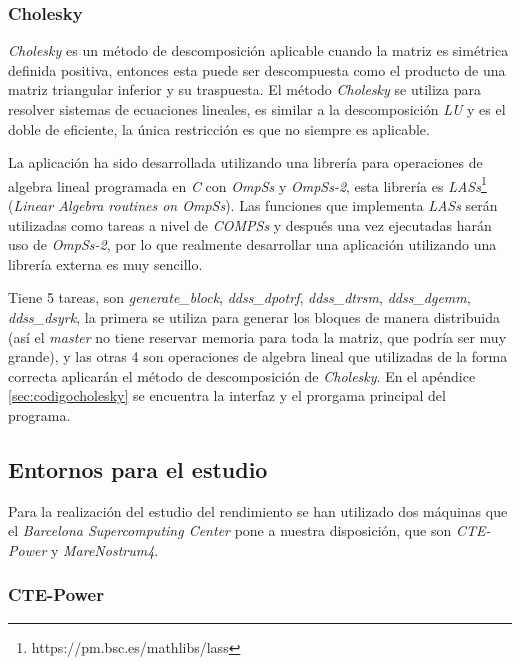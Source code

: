 \subsubsection{Cholesky}

\textit{Cholesky} es un método de descomposición aplicable cuando la matriz es simétrica definida positiva, entonces esta puede ser descompuesta como el producto de una matriz triangular inferior y su traspuesta. El método \textit{Cholesky} se utiliza para resolver sistemas de ecuaciones lineales, es similar a la descomposición \textit{LU} y es el doble de eficiente, la única restricción es que no siempre es aplicable.
\par\bigskip
La aplicación ha sido desarrollada utilizando una librería para operaciones de algebra lineal programada en \textit{C} con \textit{OmpSs} y \textit{OmpSs-2}, esta librería es \textit{LASs}\footnote{https://pm.bsc.es/mathlibs/lass} (\textit{Linear Algebra routines on OmpSs}). Las funciones que implementa \textit{LASs} serán utilizadas como tareas a nivel de \textit{COMPSs} y después una vez ejecutadas harán uso de \textit{OmpSs-2}, por lo que realmente desarrollar una aplicación utilizando una librería externa es muy sencillo.
\par\bigskip
Tiene 5 tareas, son \textit{generate\_block}, \textit{ddss\_dpotrf}, \textit{ddss\_dtrsm}, \textit{ddss\_dgemm}, \textit{ddss\_dsyrk}, la primera se utiliza para generar los bloques de manera distribuida (así el \textit{master} no tiene reservar memoria para toda la matriz, que podría ser muy grande), y las otras 4 son operaciones de algebra lineal que utilizadas de la forma correcta aplicarán el método de descomposición de \textit{Cholesky}. En el apéndice \ref{sec:codigocholesky} se encuentra la interfaz y el prorgama principal del programa.


\subsection{Entornos para el estudio}

Para la realización del estudio del rendimiento se han utilizado dos máquinas que el \textit{Barcelona Supercomputing Center} pone a nuestra disposición, que son \textit{CTE-Power} y \textit{MareNostrum4}.

\subsubsection{CTE-Power}
\label{sec:power}

